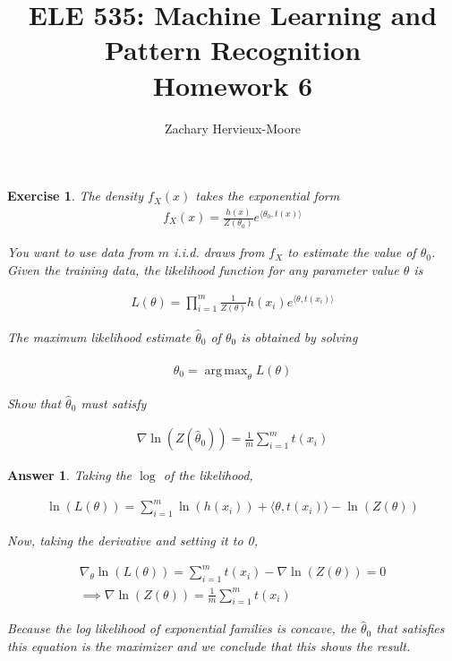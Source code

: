 \documentclass[12pt]{article}
\title{ELE 535: Machine Learning and Pattern Recognition \\ Homework 6}
\author{Zachary Hervieux-Moore}
\date{\displaydate{date}}
\DeclareMathOperator*{\argmax}{arg\,max}
\theoremstyle{colon}
\newtheorem{exercise}{Exercise}
\newtheorem*{answer}{Answer}
\begin{document}
\maketitle

\clearpage

\begin{exercise}
  The density $f_X(x)$ takes the exponential form
  \begin{gather*}
    f_X(x) = \frac{h(x)}{Z(\theta_0)} e^{\langle \theta_0, t(x) \rangle}
  \end{gather*}

  You want to use data from $m$ i.i.d. draws from $f_X$ to estimate the value of $\theta_0$. Given the training data, the likelihood function for any parameter value $\theta$ is

  \begin{gather*}
    L(\theta) = \prod_{i=1}^m \frac{1}{Z(\theta)} h(x_i) e^{\langle \theta, t(x_i) \rangle}
  \end{gather*}

  The maximum likelihood estimate $\hat{\theta}_0$ of $\theta_0$ is obtained by solving

  \begin{gather*}
    \hat{\theta}_0 = \argmax_\theta L(\theta)
  \end{gather*}

  Show that $\hat{\theta}_0$ must satisfy

  \begin{gather*}
    \nabla \ln (Z(\hat{\theta}_0)) = \frac{1}{m} \sum_{i=1}^m t(x_i)
  \end{gather*}
\end{exercise}

\begin{answer}
  Taking the $\log$ of the likelihood,

  \begin{gather*}
    \ln (L(\theta)) = \sum_{i=1}^m \ln(h(x_i)) + \langle \theta, t(x_i) \rangle - \ln(Z(\theta))
  \end{gather*}

  Now, taking the derivative and setting it to 0,

  \begin{gather*}
    \nabla_\theta \ln (L(\theta)) = \sum_{i=1}^m t(x_i) - \nabla \ln(Z(\theta)) = 0 \\
    \implies \nabla \ln(Z(\theta)) = \frac{1}{m} \sum_{i=1}^m t(x_i)
  \end{gather*}

  Because the log likelihood of exponential families is concave, the $\hat{\theta}_0$ that satisfies this equation is the maximizer and we conclude that this shows the result.
\end{answer}
\end{document}
